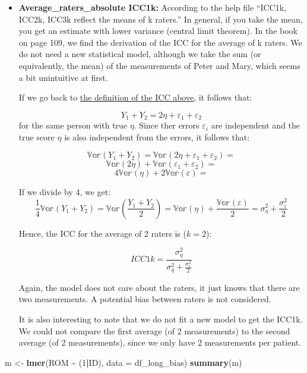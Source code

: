 \documentclass[
]{book}
\newenvironment{Shaded}{\begin{snugshade}}{\end{snugshade}}
\newcommand{\AttributeTok}[1]{\textcolor[rgb]{0.13,0.29,0.53}{#1}}
\newcommand{\DecValTok}[1]{\textcolor[rgb]{0.00,0.00,0.81}{#1}}
\newcommand{\FunctionTok}[1]{\textcolor[rgb]{0.13,0.29,0.53}{\textbf{#1}}}
\newcommand{\NormalTok}[1]{#1}
\newcommand{\OtherTok}[1]{\textcolor[rgb]{0.56,0.35,0.01}{#1}}
\newcommand{\SpecialCharTok}[1]{\textcolor[rgb]{0.81,0.36,0.00}{\textbf{#1}}}
\begin{document}
\begin{itemize}
\item
  \textbf{Average\_raters\_absolute ICC1k:}
  According to the help file ``ICC1k, ICC2k, ICC3k reflect the means of k raters.''
  In general, if you take the mean, you get an estimate with lower variance (central limit theorem).
  In the book on page 109, we find the derivation of the ICC for the average of k raters.
  We do not need a new statistical model, although we take the sum (or equivalently, the mean) of the
  measurements of Peter and Mary, which seems a bit unintuitive at first.

  If we go back to \hyperref[ICC]{the definition of the ICC above}, it follows that:

  \[Y_{1} + Y_{2} = 2 \eta + \varepsilon_1 + \varepsilon_2\]
  for the same person with true \(\eta\). Since ther errors \(\varepsilon_i\) are
  independent and the true score \(\eta\) is also independent from the errors,
  it follows that:

  \[\mathbb{Var}(Y_1 + Y_2) = \mathbb{Var}(2 \eta + \varepsilon_1 + \varepsilon_2)=\]
  \[ \mathbb{Var}(2 \eta) + \mathbb{Var}(\varepsilon_1 + \varepsilon_2)=\]
  \[4 \mathbb{Var}(\eta) + 2 \mathbb{Var}(\varepsilon)=\]

  If we divide by 4, we get:
  \[\frac{1}{4}\mathbb{Var}(Y_1 + Y_2) = \mathbb{Var}(\frac{Y_1 + Y_2}{2}) = 
  \mathbb{Var}(\eta) + \frac{\mathbb{Var}(\varepsilon)}{2} = 
  \sigma_{\eta}^2 + \frac{\sigma_{\varepsilon}^2}{2}\]

  Hence, the ICC for the average of 2 raters is (\(k=2\)):

  \[ICC1k = \frac{\sigma_{\eta}^2}{\sigma_{\eta}^2 + \frac{\sigma_{\varepsilon}^2}{2}}\]

  Again, the model does not care about the raters, it just knows that there are
  two measurements. A potential bias between raters is not considered.

  It is also interesting to note that we do not fit a new model to get the ICC1k.
  We could not compare the first average (of 2 measurements) to the second average
  (of 2 measurements), since we only have 2 measurements per patient.
\end{itemize}

\begin{Shaded}
\begin{Highlighting}[]
\NormalTok{m }\OtherTok{\textless{}{-}} \FunctionTok{lmer}\NormalTok{(ROM }\SpecialCharTok{\textasciitilde{}}\NormalTok{ (}\DecValTok{1}\SpecialCharTok{|}\NormalTok{ID), }\AttributeTok{data =}\NormalTok{ df\_long\_bias)}
\FunctionTok{summary}\NormalTok{(m)}
\end{Highlighting}
\end{Shaded}
\end{document}
